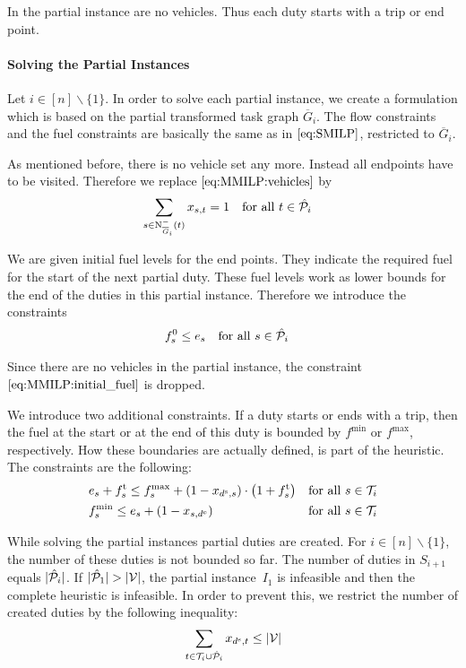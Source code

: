 In the partial instance are no vehicles. Thus each duty starts with a trip or end point.

\paragraph{Solving the Partial Instances} \parfill

Let ${i\in[n]\backslash\{1\}}$. In order to solve each partial instance, we create a formulation which is based on the partial transformed task graph $\overline{G}_i$. The flow constraints and the fuel constraints are basically the same as in $\eqref{eq:SMILP}$, restricted to $\overline{G}_i$. 

As mentioned before, there is no vehicle set any more. Instead all endpoints have to be visited. Therefore we replace $\eqref{eq:MMILP:vehicles}$ by
\begin{align}
	& \sum_{s\in\operatorname{N}_{\overline{G}_i}^-(t)} x_{s,t} = 1 && \text{for all } t\in\hat{\mathcal{P}}_i \label{eq:CMILP:start_end_points}
\end{align}

We are given initial fuel levels for the end points. They indicate the required fuel for the start of the next partial duty. These fuel levels work as lower bounds for the end of the duties in this partial instance. Therefore we introduce the constraints
\begin{align}
	& f^0_s \leq e_s && \text{for all } s\in\hat{\mathcal{P}}_i \label{eq:CMILP:final_fuel}
\end{align}

Since there are no vehicles in the partial instance, the constraint $\eqref{eq:MMILP:initial_fuel}$ is dropped.

We introduce two additional constraints. If a duty starts or ends with a trip, then the fuel at the start or at the end of this duty is bounded by $f^{\min}$ or $f^{\max}$, respectively. How these boundaries are actually defined, is part of the heuristic. The constraints are the following:
\begin{align}
	& e_s + f^{\operatorname{t}}_s \leq f^{\max}_s + \left(1-x_{d^{\operatorname{s}},s}\right)\cdot\left(1+f^{\operatorname{t}}_s\right) && \text{for all } s\in\mathcal{T}_i \label{eq:CMILP:fmax} \\
	& f^{\min}_s \leq e_s + \left(1-x_{s,d^{\operatorname{e}}}\right) && \text{for all } s\in\mathcal{T}_i \label{eq:CMILP:fmin}
\end{align}

While solving the partial instances partial duties are created. For ${i\in[n]\backslash\{1\}}$, the number of these duties is not bounded so far. The number of duties in $S_{i+1}$ equals $\vert\hat{\mathcal{P}}_i\vert$. If ${\vert\hat{\mathcal{P}}_1\vert > \vert\mathcal{V}\vert}$, the partial instance~$I_1$ is infeasible and then the complete heuristic is infeasible. In order to prevent this, we restrict the number of created duties by the following inequality:
\begin{align}
	\sum_{t\in\mathcal{T}_i\cup\hat{\mathcal{P}}_i} x_{d^{\operatorname{s}},t} \leq \vert\mathcal{V}\vert \label{eq:CMILP:strengthening}
\end{align}

